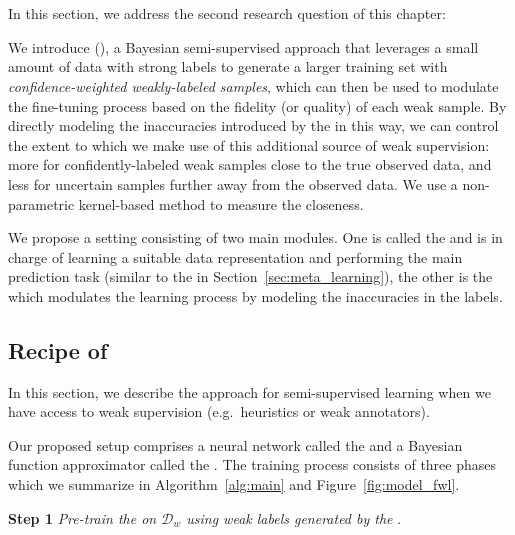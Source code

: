\newcommand{\tfunc}{T} %
\section{\fwlfull}
\label{sec:fidelity_weighted_learning}

In this section, we address the second research question of this chapter:
\begin{resqbox}
\emph{}
\end{resqbox}

We introduce \fwlfull (\fwl), a Bayesian semi-supervised approach that leverages a small amount of data with strong labels to generate a larger training set with \emph{confidence-weighted weakly-labeled samples}, which can then be used to modulate the fine-tuning process based on the fidelity (or quality) of each weak sample. By directly modeling the inaccuracies introduced by the \wa in this way, we can control the extent to which we make use of this additional source of weak supervision: more for confidently-labeled weak samples close to the true observed data, and less for uncertain samples further away from the observed data. We use a non-parametric kernel-based method to measure the closeness.

We propose a setting consisting of two main modules. One is called the \std and is in charge of learning a suitable data representation and performing the main prediction task (similar to the \tnet in Section~\ref{sec:meta_learning}), the other is the \tch which modulates the learning process by modeling the inaccuracies in the labels. 


\subsection{Recipe of \fwlfull}
\label{sec:proposed-method}
In this section, we describe the \fwl approach for semi-supervised learning when we have access to weak supervision (e.g.\ heuristics or weak annotators). 


Our proposed setup comprises a neural network called the \textbf{\std} and a Bayesian function approximator called the \textbf{\tch}. The training process consists of three phases which we summarize in Algorithm~\ref{alg:main} and Figure~\ref{fig:model_fwl}.

\textbf{Step 1} \emph{Pre-train the \std on $\mathcal{D}_w$ using weak labels generated by the \wa}. 

